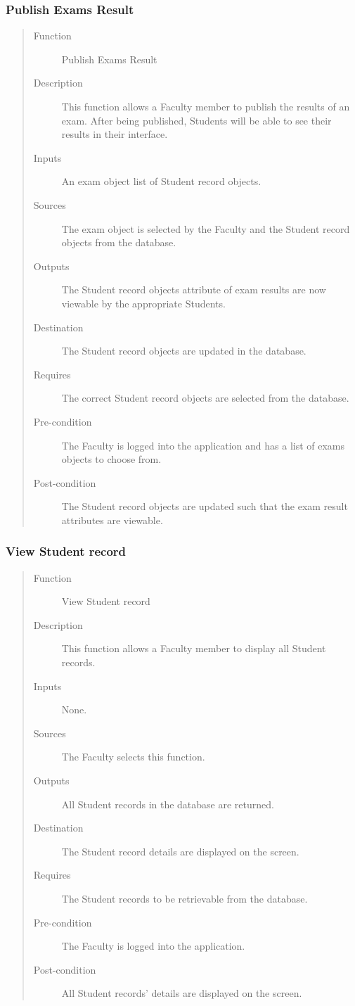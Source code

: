 \subsubsection{Publish Exams Result} 
\begin{quote} %
\begin{description}
\item[Function]
   Publish Exams Result
\item[Description]
   This function allows a Faculty member to publish the results of an exam.
   After being published, Students will be able to see their results in their
   interface.
\item[Inputs]
   An exam object list of Student record objects.
\item[Sources]
   The exam object is selected by the Faculty and the Student record objects
   from the database.
\item[Outputs]
   The Student record objects attribute of exam results are now viewable by the
   appropriate Students.
\item[Destination]
   The Student record objects are updated in the database.
\item[Requires]
   The correct Student record objects are selected from the database.
\item[Pre-condition]
   The Faculty is logged into the application and has a list of exams objects to
   choose from.
\item[Post-condition]
   The Student record objects are updated such that the exam result attributes
   are viewable.
\end{description}
\end{quote} %

\subsubsection{View Student record} 
\begin{quote} %
\begin{description}
\item[Function]
   View Student record
\item[Description]
   This function allows a Faculty member to display all Student records.
\item[Inputs]
   None.
\item[Sources]
   The Faculty selects this function.
\item[Outputs]
   All Student records in the database are returned.
\item[Destination]
   The Student record details are displayed on the screen.
\item[Requires]
   The Student records to be retrievable from the database.
\item[Pre-condition]
   The Faculty is logged into the application.
\item[Post-condition]
   All Student records' details are displayed on the screen.
\end{description}
\end{quote} %

